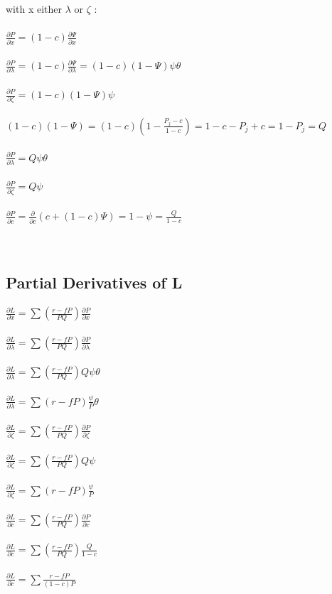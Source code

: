 \documentclass{article}
\begin{document}
with x either $\lambda$ or $\zeta$ :
\\\\
$\frac{\partial P}{\partial x}=(1-c)\frac{\partial \Psi }{\partial x}$
\\\\
$\frac{\partial P}{\partial \lambda }=(1-c)\frac{\partial \Psi }{\partial \lambda }=(1-c)(1-\Psi )\psi \theta$
\\\\
$\frac{\partial P}{\partial \zeta }=(1-c)(1-\Psi )\psi$
\\\\
$(1-c)(1-\Psi )=(1-c)(1-\frac{P_j-c}{1-c})=1-c-P_j+c=1-P_j=Q$
\\\\
$\frac{\partial P}{\partial \lambda }=Q \psi \theta$
\\\\
$\frac{\partial P}{\partial \zeta }=Q \psi$
\\\\
$\frac{\partial P}{\partial c}=\frac{\partial }{\partial c}(c+(1-c)\Psi )=1-\psi =\frac{Q}{1-c}$
\\\\\
\subsection{Partial Derivatives of L}

$\frac{\partial L}{\partial x}=\sum (\frac{ r-f P}{P Q})\frac{\partial P}{\partial x}$
\\\\
$\frac{\partial L}{\partial \lambda }=\sum (\frac{ r-f P}{P Q})\frac{\partial P}{\partial \lambda }$
\\\\
$\frac{\partial L}{\partial \lambda }=\sum (\frac{ r-f P}{P Q})Q \psi \theta$
\\\\
$\frac{\partial L}{\partial \lambda }=\sum ( r-f P)\frac{\psi }{P} \theta$
\\\\
$\frac{\partial L}{\partial \zeta }=\sum (\frac{ r-f P}{P Q})\frac{\partial P}{\partial \zeta }$
\\\\
$\frac{\partial L}{\partial \zeta }=\sum (\frac{ r-f P}{P Q})Q \psi$
\\\\
$\frac{\partial L}{\partial \zeta }=\sum ( r-f P)\frac{\psi }{P}$
\\\\
$\frac{\partial L}{\partial c}=\sum (\frac{ r-f P}{P Q})\frac{\partial P}{\partial c}$
\\\\
$\frac{\partial L}{\partial c}=\sum (\frac{ r-f P}{P Q})\frac{Q}{1-c}$
\\\\
$\frac{\partial L}{\partial c}=\sum \frac{ r-f P}{(1-c)P}$
\\\\
\end{document}
